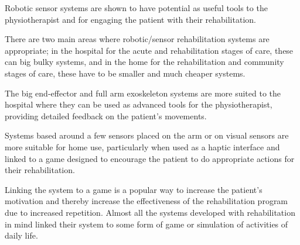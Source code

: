 \documentclass[journal]{IEEEtran}
\begin{document}
Robotic sensor systems are shown to have potential as useful tools to the 
physiotherapist and for engaging the patient with their rehabilitation.

There are two main areas where robotic/sensor rehabilitation systems are appropriate; 
in the hospital for the acute and rehabilitation stages of care, these can big bulky 
systems, and in the home for the rehabilitation and community stages of care, these 
have to be smaller and much cheaper systems.

The big end-effector and full arm exoskeleton systems are more suited to the hospital 
where they can be used as advanced tools for the physiotherapist, providing detailed 
feedback on the patient's movements.

Systems based around a few sensors placed on the arm or on visual sensors are more 
suitable for home use, particularly when used as a haptic interface and linked to 
a game designed to encourage the patient to do appropriate actions for their 
rehabilitation. 

Linking the system to a game is a popular way to increase the patient's motivation and 
thereby increase the effectiveness of the rehabilitation program due to increased 
repetition. Almost all the systems developed with rehabilitation in mind linked 
their system to some form of game or simulation of activities of daily life.





%
\end{document}
